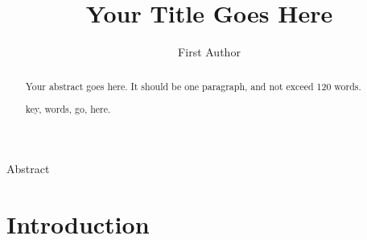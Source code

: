 \documentclass{pmet}
\begin{document}
\title{Your Title Goes Here}

\maketitle


\author{First Author}







\newpage\vspace*{24pt}


\begin{center}\vskip3pt


\vspace{32pt}

Abstract\vskip3pt

\end{center}


\begin{abstract}

Your abstract goes here. It should be one paragraph,
and not exceed 120 words.

\begin{keywords}

key, words, go, here.

\end{keywords}
\end{abstract}

\vspace{\fill}\newpage

\section{Introduction}
\end{document}

